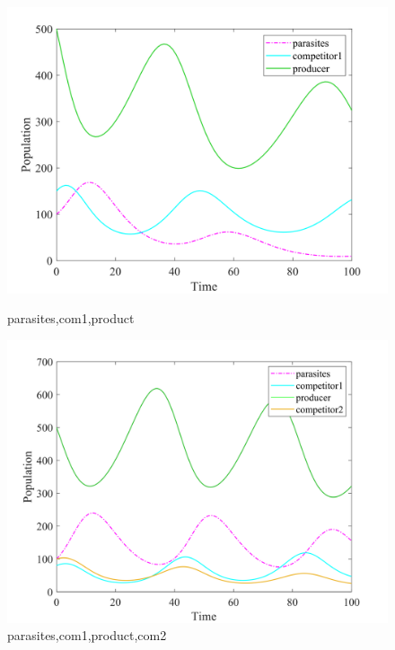 \documentclass[12pt]{article}  %
\begin{document}
\begin{figure}[htbp]
	
	\begin{minipage}[b]{0.5\linewidth}
		\centering
		\includegraphics[width=\linewidth]{img/nolamprey.png}
		\caption{parasites,com1,product}
	\end{minipage}
	\begin{minipage}[b]{0.5\linewidth}
		\centering
		\includegraphics[width=\linewidth]{img/nolamprey2-17071503179402.png}
		\caption{parasites,com1,product,com2}
	\end{minipage}
\end{figure}
\end{document}
